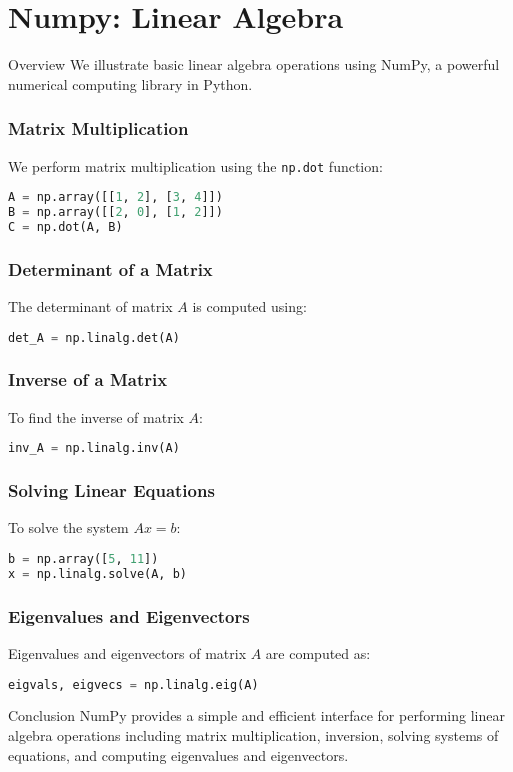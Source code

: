 \section{Numpy: Linear Algebra}
\begin{frame}[plain]
\sectionpage
\end{frame}


\begin{frame}{Overview}
We illustrate basic linear algebra operations using NumPy, a powerful numerical computing library in Python.
\end{frame}



\begin{frame}[fragile]
\frametitle{Matrix Multiplication}
We perform matrix multiplication using the \texttt{np.dot} function:

\begin{lstlisting}[language=Python]
A = np.array([[1, 2], [3, 4]])
B = np.array([[2, 0], [1, 2]])
C = np.dot(A, B)
\end{lstlisting}
\end{frame}


\begin{frame}[fragile]
\frametitle{Determinant of a Matrix}
The determinant of matrix \( A \) is computed using:

\begin{lstlisting}[language=Python]
det_A = np.linalg.det(A)
\end{lstlisting}
\end{frame}


\begin{frame}[fragile]
\frametitle{Inverse of a Matrix}
To find the inverse of matrix \( A \):

\begin{lstlisting}[language=Python]
inv_A = np.linalg.inv(A)
\end{lstlisting}

\end{frame}

\begin{frame}[fragile]
\frametitle{Solving Linear Equations}
To solve the system \( A x = b \):

\begin{lstlisting}[language=Python]
b = np.array([5, 11])
x = np.linalg.solve(A, b)
\end{lstlisting}
\end{frame}


\begin{frame}[fragile]
\frametitle{Eigenvalues and Eigenvectors}
Eigenvalues and eigenvectors of matrix \( A \) are computed as:

\begin{lstlisting}[language=Python]
eigvals, eigvecs = np.linalg.eig(A)
\end{lstlisting}
\end{frame}


\begin{frame}{Conclusion}
NumPy provides a simple and efficient interface for performing linear algebra operations including matrix multiplication, inversion, solving systems of equations, and computing eigenvalues and eigenvectors.
\end{frame}

